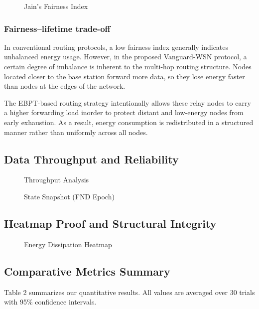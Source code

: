 \documentclass[conference]{IEEEtran}
\begin{document}
\begin{figure}[htbp]
\centerline{}
\caption{Jain's Fairness Index}
\label{fig6}
\end{figure}

\subsubsection{Fairness–lifetime trade-off}
In conventional routing protocols, a low fairness index generally indicates unbalanced energy usage. However, in the proposed Vanguard-WSN protocol, a certain degree of imbalance is inherent to the multi-hop routing structure. Nodes located closer to the base station forward more data, so they lose energy faster than nodes at the edges of the network.

The EBPT-based routing strategy intentionally allows these relay nodes to carry a higher forwarding load inorder to protect distant and low-energy nodes from early exhaustion. As a result, energy consumption is redistributed in a structured manner rather than uniformly across all nodes.

\subsection{Data Throughput and Reliability}

\begin{figure}[htbp]
\centerline{}
\caption{Throughput Analysis}
\label{fig7}
\end{figure}

\begin{figure}[htbp]
\centerline{}
\caption{State Snapshot (FND Epoch)}
\label{fig9}
\end{figure}

\subsection{Heatmap Proof and Structural Integrity}

\begin{figure}[htbp]
\centerline{}
\caption{Energy Dissipation Heatmap}
\label{fig8}
\end{figure}

\subsection{Comparative Metrics Summary}
Table 2 summarizes our quantitative results. All values are averaged over 30 trials with 95\% confidence intervals.
\end{document}
